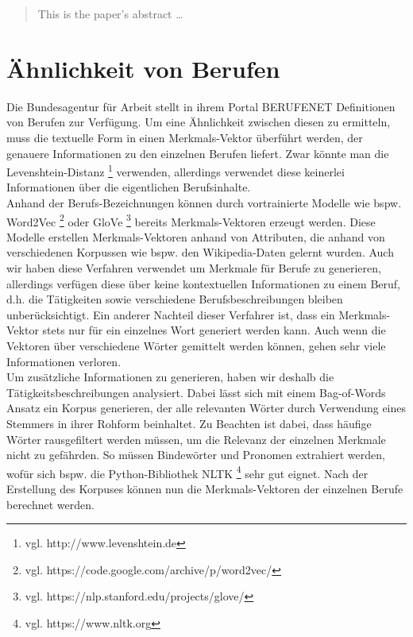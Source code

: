 \documentclass[12pt]{article}
\begin{document}
\maketitle

\begin{abstract}
This is the paper's abstract \ldots
\end{abstract}

\section{Ähnlichkeit von Berufen}

Die Bundesagentur für Arbeit stellt in ihrem Portal BERUFENET Definitionen von Berufen zur Verfügung. Um eine Ähnlichkeit zwischen diesen zu ermitteln, muss die textuelle Form in einen Merkmals-Vektor überführt werden, der genauere Informationen zu den einzelnen Berufen liefert. Zwar könnte man die Levenshtein-Distanz \footnote{vgl. http://www.levenshtein.de} verwenden, allerdings verwendet diese keinerlei Informationen über die eigentlichen Berufsinhalte.\\

 Anhand der Berufs-Bezeichnungen können durch vortrainierte Modelle wie bspw. Word2Vec \footnote{vgl. https://code.google.com/archive/p/word2vec/} oder GloVe \footnote{vgl. https://nlp.stanford.edu/projects/glove/} bereits Merkmals-Vektoren erzeugt werden. Diese Modelle erstellen Merkmals-Vektoren anhand von Attributen, die anhand von verschiedenen Korpussen wie bspw. den Wikipedia-Daten gelernt wurden. Auch wir haben diese Verfahren verwendet um Merkmale für Berufe zu generieren, allerdings verfügen diese über keine kontextuellen Informationen zu einem Beruf, d.h. die Tätigkeiten sowie verschiedene Berufsbeschreibungen bleiben unberücksichtigt. Ein anderer Nachteil dieser Verfahrer ist, dass ein Merkmals-Vektor stets nur für ein einzelnes Wort generiert werden kann. Auch wenn die Vektoren über verschiedene Wörter gemittelt werden können, gehen sehr viele Informationen verloren.\\

Um zusätzliche Informationen zu generieren, haben wir deshalb die Tätigkeitsbeschreibungen analysiert. Dabei lässt sich mit einem Bag-of-Words Ansatz ein Korpus generieren, der alle relevanten Wörter durch Verwendung eines Stemmers in ihrer Rohform beinhaltet. Zu Beachten ist dabei, dass häufige Wörter rausgefiltert werden müssen, um die Relevanz der einzelnen Merkmale nicht zu gefährden. So müssen Bindewörter und Pronomen extrahiert werden, wofür sich bspw. die Python-Bibliothek NLTK \footnote{vgl. https://www.nltk.org} sehr gut eignet. Nach der Erstellung des Korpuses können nun die Merkmals-Vektoren der einzelnen Berufe berechnet werden.
\end{document}
